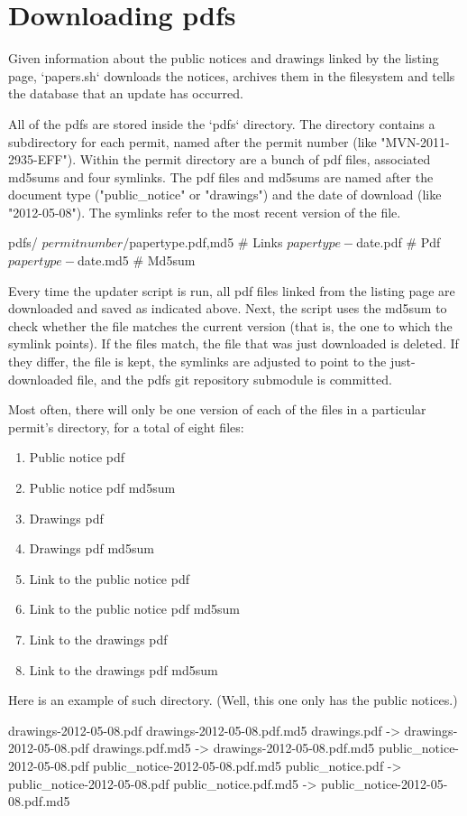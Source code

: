\section{Downloading pdfs}
Given information about the public notices and drawings linked by the listing
page, `papers.sh` downloads the notices, archives them in the filesystem
and tells the database that an update has occurred.

All of the pdfs are stored inside the `pdfs` directory. The directory contains
a subdirectory for each permit, named after the permit number (like
"MVN-2011-2935-EFF"). Within the permit directory are a bunch of pdf files,
associated md5sums and four symlinks. The pdf files and md5sums are named
after the document type ("public_notice" or "drawings") and the date of download
(like "2012-05-08"). The symlinks refer to the most recent version of the file.

    pdfs/
      ${permitnumber}/
        ${papertype}.{pdf,md5} # Links
        ${papertype}-${date}.pdf # Pdf
        ${papertype}-${date}.md5 # Md5sum

Every time the updater script is run, all pdf files linked from the listing
page are downloaded and saved as indicated above. Next, the script uses the
md5sum to check whether the file matches the current version (that is, the
one to which the symlink points). If the files match, the file that was just
downloaded is deleted. If they differ, the file is kept, the symlinks are
adjusted to point to the just-downloaded file, and the pdfs git repository
submodule is committed.

Most often, there will only be one version of each of the files in a
particular permit's directory, for a total of eight files:
\begin{enumerate}
\item Public notice pdf
\item Public notice pdf md5sum
\item Drawings pdf
\item Drawings pdf md5sum
\item Link to the public notice pdf
\item Link to the public notice pdf md5sum
\item Link to the drawings pdf
\item Link to the drawings pdf md5sum
\end{enumerate}

Here is an example of such directory. (Well, this one only has the public
notices.)

    drawings-2012-05-08.pdf
    drawings-2012-05-08.pdf.md5
    drawings.pdf -> drawings-2012-05-08.pdf
    drawings.pdf.md5 -> drawings-2012-05-08.pdf.md5
    public_notice-2012-05-08.pdf
    public_notice-2012-05-08.pdf.md5
    public_notice.pdf -> public_notice-2012-05-08.pdf
    public_notice.pdf.md5 -> public_notice-2012-05-08.pdf.md5

